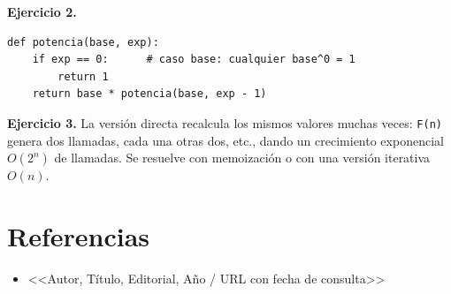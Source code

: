 \documentclass[11pt,a4paper]{article}
\begin{document}
\textbf{Ejercicio 2.}
\begin{lstlisting}
def potencia(base, exp):
    if exp == 0:      # caso base: cualquier base^0 = 1
        return 1
    return base * potencia(base, exp - 1)
\end{lstlisting}

\textbf{Ejercicio 3.} La versión directa recalcula los mismos valores muchas
veces: \texttt{F(n)} genera dos llamadas, cada una otras dos, etc., dando un
crecimiento exponencial $O(2^n)$ de llamadas. Se resuelve con memoización o
con una versión iterativa $O(n)$.

\section*{Referencias}
\begin{itemize}[leftmargin=1.4em,nosep]
  \item <<Autor, Título, Editorial, Año / URL con fecha de consulta>>
\end{itemize}
\end{document}
